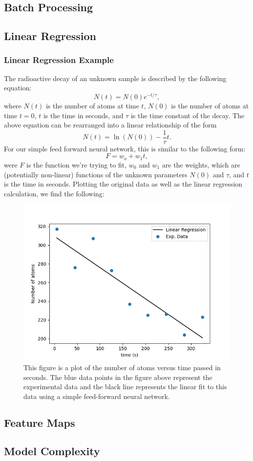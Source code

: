\subsection{Batch Processing}

\subsection{Linear Regression}
\subsubsection{Linear Regression Example}
The radioactive decay of an unknown sample is described by the following equation:
\begin{equation}
N(t) = N(0) e^{-t/\tau},
\end{equation}
where $N(t)$ is the number of atoms at time $t$, $N(0)$ is the number of atoms at time $t=0$, $t$ is the time in seconds, and $\tau$ is the time constant of the decay. The above equation can be rearranged into a linear relationship of the form 
\begin{equation}
N(t) = \ln{\left( N(0) \right)} - \frac{1}{\tau}t.
\end{equation}
For our simple feed forward neural network, this is similar to the following form:
\begin{equation}
F = w_o + w_1t,
\end{equation}
were $F$ is the function we're trying to fit, $w_0$ and $w_1$ are the weights, which are (potentially non-linear) functions of the unknown parameters $N(0)$ and $\tau$, and $t$ is the time in seconds. Plotting the original data as well as the linear regression calculation, we find the following:
\begin{figure}[H]
\centering
\includegraphics[scale=0.75]{../figures/decay_data.png}
\caption{This figure is a plot of the number of atoms versus time passed in seconds. The blue data points in the figure above represent the experimental data and the black line represents the linear fit to this data using a simple feed-forward neural network.}
\end{figure}

\subsection{Feature Maps}

\subsection{Model Complexity}